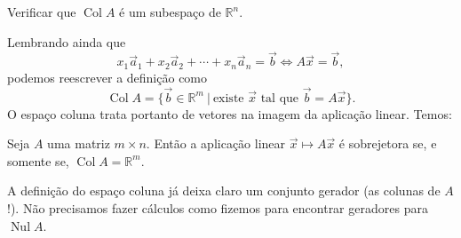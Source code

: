 \documentclass[../livro.tex]{subfiles}  %
\begin{document}
\begin{exercise}
	Verificar que $\operatorname{Col} A$ é um subespaço de $\mathbb{R}^n$.
\end{exercise}

Lembrando ainda que
\begin{equation}
x_1 \vec{a}_1 + x_2 \vec{a}_2 + \cdots + x_n \vec{a}_n = \vec{b} \iff A \vec{x} = \vec{b},
\end{equation} podemos reescrever a definição como 
\begin{equation}
\operatorname{Col} A = \{ \vec{b} \in \mathbb{R}^m \ | \ \text{existe } \vec{x} \text{ tal que } \vec{b} = A \vec{x} \}.
\end{equation} O espaço coluna trata portanto de vetores na imagem da aplicação linear. Temos:

\begin{proposition}
	Seja $A$ uma matriz $m\times n$. Então a aplicação linear $\vec{x} \mapsto A \vec{x}$ é sobrejetora se, e somente se, $\operatorname{Col} A = \mathbb{R}^m.$
\end{proposition}

A definição do espaço coluna já deixa claro um conjunto gerador (as colunas de $A$!). Não precisamos fazer cálculos como fizemos para encontrar geradores para $\operatorname{Nul} A$.
\end{document}
